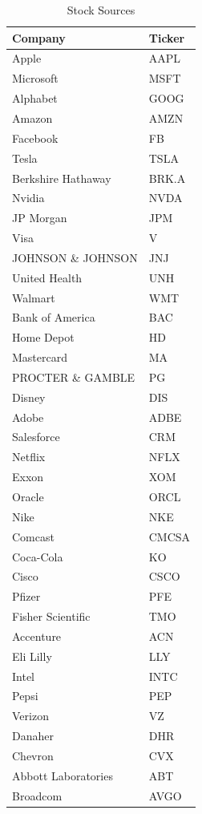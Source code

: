 \documentclass[conference]{IEEEtran}
\begin{document}
\begin{table}[ht]
    \caption{Stock Sources}
    \centering
\begin{tabular}{|l|l|}
    \hline
    \textbf{Company} & \textbf{Ticker} \\
    \hline
    Apple & AAPL \\
    Microsoft & MSFT \\
    Alphabet & GOOG \\
    Amazon & AMZN \\
    Facebook & FB \\
    Tesla & TSLA \\
    Berkshire Hathaway & BRK.A \\
    Nvidia & NVDA \\
    JP Morgan & JPM \\
    Visa & V \\
    JOHNSON \& JOHNSON & JNJ \\
    United Health & UNH \\
    Walmart & WMT \\
    Bank of America & BAC \\
    Home Depot & HD \\
    Mastercard & MA \\
    PROCTER \& GAMBLE & PG \\
    Disney & DIS \\
    Adobe & ADBE \\
    Salesforce & CRM \\
    Netflix & NFLX \\
    Exxon & XOM \\
    Oracle & ORCL \\
    Nike & NKE \\
    Comcast & CMCSA \\
    Coca-Cola & KO \\
    Cisco & CSCO \\
    Pfizer & PFE \\
    Fisher Scientific & TMO \\
    Accenture & ACN \\
    Eli Lilly & LLY \\
    Intel & INTC \\
    Pepsi & PEP \\
    Verizon & VZ \\
    Danaher & DHR \\
    Chevron & CVX \\
    Abbott Laboratories & ABT \\
    Broadcom & AVGO \\

\end{tabular}
\end{table}
\end{document}

